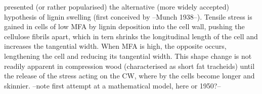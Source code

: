 \cite{Boyd_1972} presented (or rather popularised) the alternative (more widely
accepted) hypothesis of lignin swelling (first conceived by --Munch 1938--). Tensile
stress is gained in cells of low MFA by lignin deposition into the cell wall,
pushing the cellulose fibrils apart, which in tern shrinks the longitudinal
length of the cell and increases the tangential width. When MFA is high, the
opposite occurs, lengthening the cell and reducing its tangential width. This
shape change is not readily apparent in compression wood (characterised as short fat
tracheids) until the release of the stress acting on the CW, where by the cells
become longer and skinnier.
--note first attempt at a mathematical model, here or 1950?--